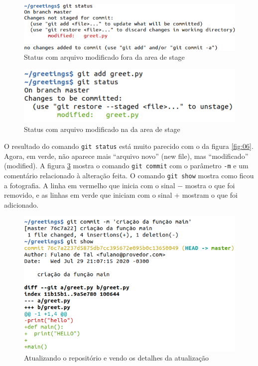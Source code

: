\documentclass[a4paper]{book}
\begin{document}
\begin{figure}[ht]
\caption{Status com arquivo modificado fora da area de stage}
\label{fig:10}
\centering
\includegraphics[scale=0.6]{"images/10-Status com arquivo modificado fora da area de stage.png"}
\end{figure}


\begin{figure}[ht]
\caption{Status com arquivo modificado na da area de stage}
\label{fig:11}
\centering
\includegraphics[scale=0.6]{"images/11-Status com arquivo modificado na da area de stage.png"}
\end{figure}

O resultado do comando \texttt{git status} está muito parecido 
com o da figura \ref{fig:06}. Agora, em verde, não aparece
mais ``arquivo novo'' (new file), mas ``modificado'' (modified).
%
A figura \ref{fig:12} mostra o comando \texttt{git commit} com o
parâmetro \texttt{-m} e um comentário relacionado à alteração feita.
O comando \texttt{git show} mostra como ficou a fotografia.
A linha em vermelho que inicia com o sinal $-$ mostra
o que foi removido, e as linhas em verde que iniciam com
o sinal $+$ mostram o que foi adicionado.

\begin{figure}[ht]
\caption{Atualizando o repositório e vendo os detalhes da atualização}
\label{fig:12}
\centering
\includegraphics[scale=0.6]{"images/12-Atualizando o repositório e vendo os detalhes da atualização.png"}
\end{figure}
\end{document}
